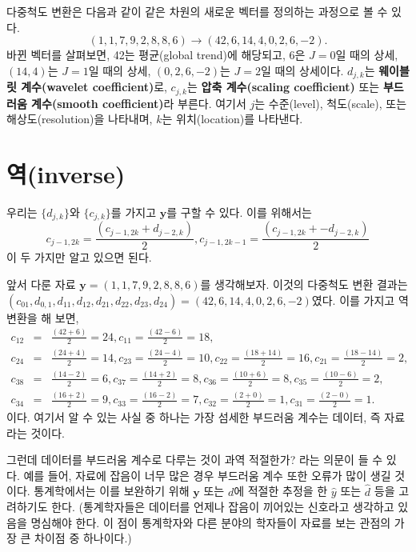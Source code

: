 \documentclass[b5paper,]{scrbook}
\theoremstyle{plain}
\theoremstyle{definition}
\numberwithin{equation}{section}
\let\BeginKnitrBlock\begin \let\EndKnitrBlock\end
\begin{document}
다중척도 변환은 다음과 같이 같은 차원의 새로운 벡터를 정의하는 과정으로 볼 수 있다.
\[(1,1,7,9,2,8,8,6) \rightarrow (42,6,14,4,0,2,6,-2).\]
바뀐 벡터를 살펴보면, 42는 평균(global trend)에 해당되고, 6은 \(J=0\)일 때의 상세, \((14,4)\)는 \(J=1\)일 때의 상세, \((0,2,6,-2)\)는 \(J=2\)일 때의 상세이다. \(d_{j,k}\)는 \textbf{웨이블릿 계수(wavelet coefficient)}로, \(c_{j,k}\)는 \textbf{압축 계수(scaling coefficient)} 또는 \textbf{부드러움 계수(smooth coefficient)}라 부른다. 여기서 \(j\)는 수준(level), 척도(scale), 또는 해상도(resolution)을 나타내며, \(k\)는 위치(location)를 나타낸다.

\hypertarget{inverse}{%
\section{역(inverse)}\label{inverse}}

우리는 \(\{ d_{j,k} \}\)와 \(\{ c_{j,k} \}\)를 가지고 \(\mathbf{y}\)를 구할 수 있다. 이를 위해서는
\[c_{j-1,2k}=\frac{(c_{j-1,2k}+d_{j-2,k})}{2}, c_{j-1,2k-1}=\frac{(c_{j-1,2k}+-d_{j-2,k})}{2}\]
이 두 가지만 알고 있으면 된다.

\BeginKnitrBlock{example}[다중척도 역변환]
\protect\hypertarget{exm:unnamed-chunk-271}{}{\label{exm:unnamed-chunk-271} {} }앞서 다룬 자료 \(\mathbf{y}=(1,1,7,9,2,8,8,6)\)를 생각해보자. 이것의 다중척도 변환 결과는 \((c_{01},d_{0,1},d_{11},d_{12},d_{21},d_{22},d_{23},d_{24})=(42,6,14,4,0,2,6,-2)\)였다. 이를 가지고 역변환을 해 보면,
\begin{eqnarray*}
c_{12}&=&\frac{(42+6)}{2}=24, c_{11}=\frac{(42-6)}{2}=18,\\
c_{24}&=&\frac{(24+4)}{2}=14, c_{23}=\frac{(24-4)}{2}=10, c_{22}=\frac{(18+14)}{2}=16, c_{21}=\frac{(18-14)}{2}=2,\\
c_{38}&=&\frac{(14-2)}{2}=6, c_{37}=\frac{(14+2)}{2}=8, c_{36}=\frac{(10+6)}{2}=8, c_{35}=\frac{(10-6)}{2}=2,\\
c_{34}&=&\frac{(16+2)}{2}=9, c_{33}=\frac{(16-2)}{2}=7, c_{32}=\frac{(2+0)}{2}=1, c_{31}=\frac{(2-0)}{2}=1.
\end{eqnarray*}
이다. 여기서 알 수 있는 사실 중 하나는 가장 섬세한 부드러움 계수는 데이터, 즉 자료라는 것이다.
\EndKnitrBlock{example}

그런데 데이터를 부드러움 계수로 다루는 것이 과역 적절한가? 라는 의문이 들 수 있다. 예를 들어, 자료에 잡음이 너무 많은 경우 부드러움 계수 또한 오류가 많이 생길 것이다. 통계학에서는 이를 보완하기 위해 \(\mathbf{y}\) 또는 \(d\)에 적절한 추정을 한 \(\hat{y}\) 또는 \(\hat{d}\) 등을 고려하기도 한다. (통계학자들은 데이터를 언제나 잡음이 끼어있는 신호라고 생각하고 있음을 명심해야 한다. 이 점이 통계학자와 다른 분야의 학자들이 자료를 보는 관점의 가장 큰 차이점 중 하나이다.)
\end{document}
